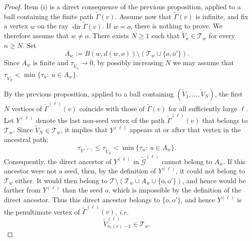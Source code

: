 \documentclass[french]{article}
\newcommand{\T}{\mathcal{T}}
\renewcommand{\dir}{\mathop{dir}}
\renewcommand{\1}{\mathds{1}}
\begin{document}
\begin{proof}
Item (i) is a direct consequence of the previous proposition, applied to a ball containing the finite path $\tilde{\Gamma}(v)$. Assume now that $\tilde{\Gamma}(v)$ is infinite, and fix a vertex $w$ on the ray $\dir\tilde{\Gamma}(v)$. If $w=o$, there is nothing to prove. We therefore assume that $w\neq o$. There exists $N\ge 1$ such that
$\tilde{V}_n\in\T_w$ for every $n\ge N$. Set
$$
A_w:=B(w,d(w,o))\setminus(\T_w\cup\{o,o'\}).
$$
Since $A_w$ is finite and $\tau_{\tilde{V}_n}\to 0$, by possibly increasing $N$ we may assume that $\tau_{\tilde{V}_N}<\min\{\tau_u:\ u\in A_w\}$.

By the previous proposition, applied to a ball containing $(\tilde{V}_1,\ldots,\tilde{V}_N)$, the first $N$ vertices of $\tilde{\Gamma}^{(\ell)}(v)$ coincide with those of $\tilde{\Gamma}(v)$ for all sufficiently large $\ell$.
Let $Y^{(\ell)}$ denote the last non-seed vertex of the path $\tilde{\Gamma}^{(\ell)}(v)$ that belongs to $\T_w$. Since $\tilde{V}_N \in \T_w$, it implies that $Y^{(\ell)}$ appears at or after that vertex in the ancestral path:
$$
\tau_{Y^{(\ell)}}
\le \tau_{\tilde{V}_{N}}
<
\min\{\tau_u:\ u\in A_w\}.
$$
Consequently, the direct ancestor of $Y^{(\ell)}$ in $\tilde{\mathcal{G}}^{(\ell)}$ cannot belong to $A_w$. If this ancestor were not a seed, then, by the definition of $Y^{(\ell)}$, it could not belong to $\T_w$ either. It would then belong to $\T\setminus(\T_w\cup A_w\cup\{o,o'\})$, and hence would be farther from $Y^{(\ell)}$ than the seed $o$, which is impossible by the definition of the direct ancestor. Thus this direct ancestor belongs to $\{o,o'\}$, and hence $Y^{(\ell)}$ is the penultimate vertex of $\tilde{\Gamma}^{(\ell)}(v)$, \emph{i.e.}
$$\tilde{V}^{(\ell)}_{n_\ell(v)-1}\in \T_w.$$
\end{proof}
\end{document}
